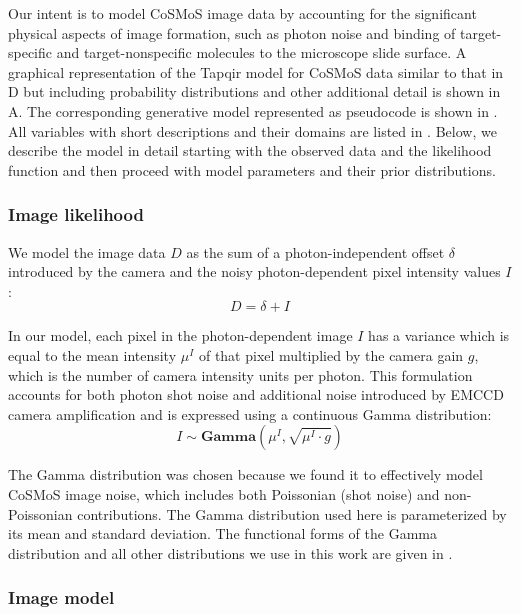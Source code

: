 Our intent is to model CoSMoS image data by accounting for the significant physical aspects of image formation, such as photon noise and binding of target-specific and target-nonspecific molecules to the microscope slide surface. A graphical representation of the Tapqir model for CoSMoS data similar to that in D but including probability distributions and other additional detail is shown in A. The corresponding generative model represented as pseudocode is shown in . All variables with short descriptions and their domains are listed in . Below, we describe the model in detail starting with the observed data and the likelihood function and then proceed with model parameters and their prior distributions.

\subsubsection{Image likelihood}

We model the image data $D$ as the sum of a photon-independent offset $\delta$ introduced by the camera and the noisy photon-dependent pixel intensity values $I$:
%
\begin{equation}
    D = \delta + I
\end{equation}

In our model, each pixel in the photon-dependent image $I$ has a  variance which is equal to  the mean intensity $\mu^I$ of that pixel multiplied by the camera gain $g$, which is the number of camera intensity units per photon. This formulation accounts for both photon shot noise and additional noise introduced by EMCCD camera amplification \citep{Van_Vliet1998-jk} and is expressed using a continuous Gamma distribution:
%
\begin{equation}
    I \sim \mathbf{Gamma} (\mu^I, \sqrt{\mu^I \cdot g})
\end{equation}

The Gamma distribution was chosen because we found it to effectively model CoSMoS image noise, which includes both Poissonian (shot noise) and non-Poissonian contributions. The Gamma distribution used here is parameterized by its mean and standard deviation. The functional forms of the Gamma distribution and all other distributions we use in this work are given in .

\subsubsection{Image model}

